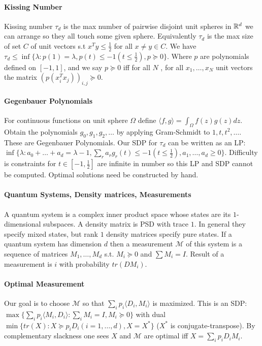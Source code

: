 \documentclass[letterpaper,11pt,oneside,onecolumn]{article}
\newcommand{\cM}{\mathcal{M}} \newcommand{\cN}{\mathcal{N}}
\begin{document}
\paragraph{Kissing Number} Kissing number $\tau_d$ is the max number of pairwise disjoint unit spheres in $\mathbb{R}^d$ we can arrange so they all touch some given sphere. Equivalently $\tau_d$ is the max size of set $C$ of unit vectors s.t $x^Ty\leq \frac{1}{2}$ for all $x\neq y \in C$. We have $\tau_d \leq \inf \{\lambda: p(1) = \lambda, p(t) \leq -1 (t \leq \frac{1}{2}), p \succcurlyeq 0\}$. Where $p$ are polynomials defined on $[-1,1]$, and we say $p\succcurlyeq 0$ iff for all $N$ , for all $x_1,\dots, x_N$ unit vectors the matrix $(p(x_i^Tx_j))_{i,j} \succcurlyeq 0$.
\paragraph{Gegenbauer Polynomials} For continuous functions on unit sphere $\Omega$ define $\langle f, g\rangle = \int_\Omega f(z)g(z) dz$. Obtain the polynomials $g_0, g_1, g_2,\dots$ by applying Gram-Schmidt to $1,t,t^2,\dots$. These are Gegenbauer Polynomials. Our SDP for $\tau_d$ can be written as an LP: $\inf\{\lambda: a_0 + \dots + a_d = \lambda - 1, \sum_r a_r g_r(t) \leq -1 (t\leq \frac{1}{2}), a_1, \dots, a_d \geq 0\}$. Difficulty is constraints for $t\in [-1,\frac{1}{2}]$ are infinite in number so this LP and SDP cannot be computed. Optimal solutions need be constructed by hand.

\paragraph{Quantum Systems, Density matrices, Measurements}A quantum system is a complex inner product space whose states are its $1$-dimensional subspaces. A density matrix is PSD with trace $1$. In general they specify mixed states, but rank $1$ density matrices specify pure states. If a quantum system has dimension $d$ then a measurement $\cM$ of this system is a sequence of matrices $M_1, \dots, M_d$ s.t. $M_i \succcurlyeq 0$ and $\sum M_i = I$. Result of a measurement is $i$ with probability $tr(DM_i)$.
\paragraph{Optimal Measurement}
Our goal is to choose $\cM$ so that $\sum_i p_i \langle D_i, M_i \rangle$ is maximized. This is an SDP: $\max \{\sum_i p_i\langle M_i, D_i \rangle : \sum_i M_i = I, M_i \succcurlyeq 0\}$ with dual $\min\{tr(X) : X \succcurlyeq p_iD_i (i =1, \dots, d), X = X^*\}$ ($X^*$ is conjugate-transpose). By complementary slackness one sees $X$ and $\cM$ are optimal iff $X=\sum_i p_iD_iM_i$.
\end{document}
